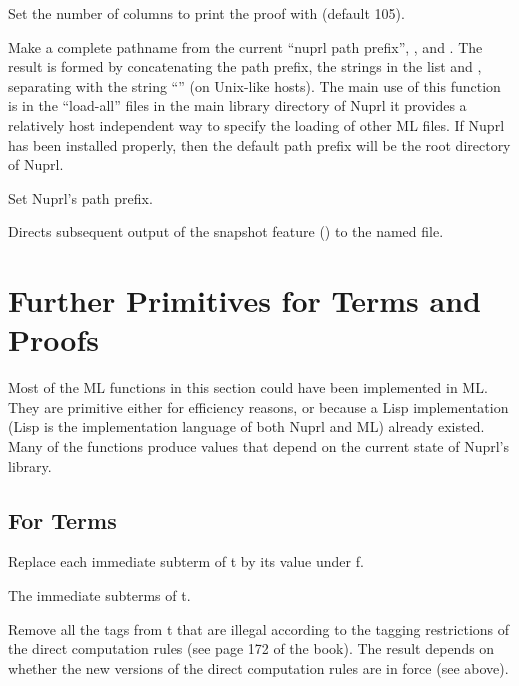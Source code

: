  Set the number of columns to print
the proof with (default 105).

 Make a complete pathname from the current ``nuprl path prefix'',
, and .  The result is formed by
concatenating the path prefix, the strings in the list 
and , separating with the string ``\tid{/}'' (on Unix-like
hosts).  The main use of this function is in the ``load-all'' files in the
main library directory of Nuprl it provides a relatively host independent
way to specify the loading of other ML files.  If Nuprl has been installed
properly, then the default path prefix will be the root directory of Nuprl.

 Set Nuprl's
path prefix.  

 Directs subsequent
output of the snapshot feature (\PRINT) to the named file.






\section{Further Primitives for Terms and Proofs}

Most of the ML functions in this section could have been implemented in ML.
They are primitive either for efficiency reasons, or because a Lisp
implementation (Lisp is the implementation language of both Nuprl and ML)
already existed.  Many of the functions produce values that depend on the
current state of Nuprl's library.

\subsection*{For Terms}

  Replace each immediate
subterm of t by its value under f.

  The immediate subterms of t.



  Remove all the tags from t that are
illegal according to the tagging restrictions of the direct computation
rules (see page 172 of the book).  The result depends on whether the new
versions of the direct computation rules are in force (see above).

